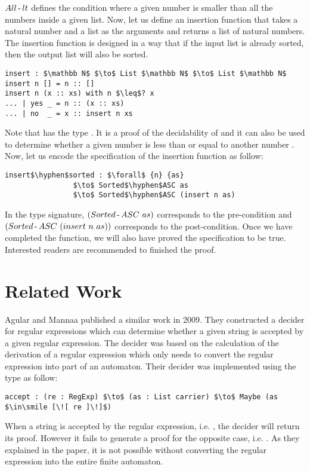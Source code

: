 \par \(All\operatorname{-} lt\) defines the condition where a given
number is smaller than all the numbers inside a given list. Now, let
us define an insertion function that takes a natural number and a list as the arguments and returns a list of
natural numbers. The insertion function is designed in a way that if the
input list is already sorted, then the output list will also be sorted. 
\begin{lstlisting}[mathescape=true,xleftmargin=.3\textwidth]
insert : $\mathbb N$ $\to$ List $\mathbb N$ $\to$ List $\mathbb N$
insert n [] = n :: []
insert n (x :: xs) with n $\leq$? x
... | yes _ = n :: (x :: xs)
... | no  _ = x :: insert n xs
\end{lstlisting}

\par Note that  has the type . It is a proof of the decidability of \mb{\_\leq\_} and it can also be used to determine whether
a given number  is less than or equal to another number
. Now, let us encode the specification of the insertion function
as follow: 
\begin{lstlisting}[mathescape=true,xleftmargin=.3\textwidth]
insert$\hyphen$sorted : $\forall$ {n} {as} 
                $\to$ Sorted$\hyphen$ASC as 
                $\to$ Sorted$\hyphen$ASC (insert n as)
\end{lstlisting}

\par In the type signature, \((Sorted\hyphen ASC\ as)\) corresponds to the pre-condition and
\((Sorted\operatorname{-} ASC\ (insert\ n\ as))\) corresponds to the
post-condition. Once we have completed the
function, we will also have proved the specification to be
true. Interested readers are recommended to finished the proof. 



\newpage
\section{Related Work}
\par Agular and Mannaa published a
similar work \cite{agular2009} in 2009. They constructed a decider for
regular expressions which can determine whether
a given string is accepted by a given regular expression. The decider was based on the calculation of the derivation of a regular
expression which only needs to convert the regular expression into
part of an automaton. Their decider was implemented using the  type as follow:
\begin{lstlisting}[mathescape=true,xleftmargin=.3\textwidth]
accept : (re : RegExp) $\to$ (as : List carrier) $\to$ Maybe (as $\in\smile [\![ re ]\!]$)
\end{lstlisting}
\par When a string is accepted by the regular expression, i.e. , the decider will return its proof. However it fails to generate a
proof for the opposite case, i.e. . As they
explained in the paper, it is not possible without converting the regular expression into
the entire finite automaton. 

